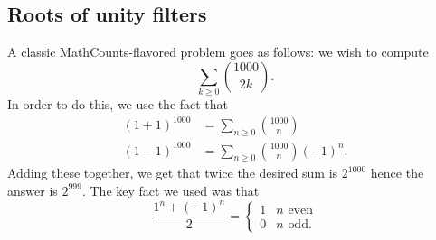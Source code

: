 \documentclass[11pt]{scrartcl}
\begin{document}
\subsection{Roots of unity filters}
A classic MathCounts-flavored problem goes as follows:
we wish to compute
\[ \sum_{k \ge 0} \binom{1000}{2k}. \]
In order to do this, we use the fact that
\begin{align*}
  (1+1)^{1000} &= \sum_{n \ge 0} \binom{1000}{n}  \\
  (1-1)^{1000} &= \sum_{n \ge 0} \binom{1000}{n}(-1)^n.
\end{align*}
Adding these together, we get that twice the desired sum is $2^{1000}$
hence the answer is $2^{999}$.
The key fact we used was that
\[ \frac{1^n + (-1)^n}{2}
  = \begin{cases}
    1 & n \text{ even} \\
    0 & n \text{ odd}.
  \end{cases}
\]
\end{document}
